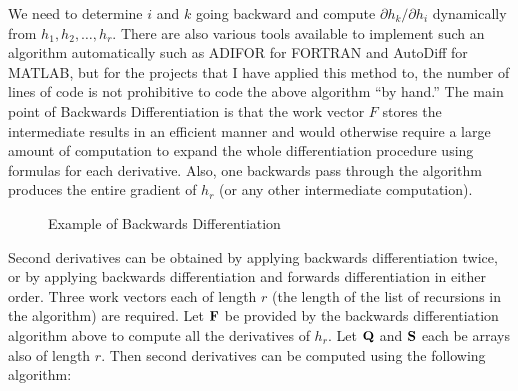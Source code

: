 We need to determine $i$ and $k$ going backward and compute $\partial h_k/\partial h_i$ dynamically from $h_1, h_2, \hdots, h_r$. There are also various tools available to 
implement such an algorithm automatically such as ADIFOR for FORTRAN and AutoDiff for MATLAB, but for the projects that I have applied this method to, the number of lines of code
is not prohibitive to code the above algorithm ``by hand.'' The main point of Backwards Differentiation is that the work vector $F$ stores the intermediate results in an efficient 
manner and would otherwise require a large amount of computation to expand the whole differentiation procedure using formulas for each derivative. Also, one backwards pass through the algorithm produces the entire gradient of $h_r$ (or any other intermediate computation). \\
\begin{figure}[hptp]
\begin{center}
   \caption{Example of Backwards Differentiation}
   \label{fig:BackwardsDifferentiation} 
\end{center}
\end{figure}

Second derivatives can be obtained by applying backwards differentiation twice, or by applying backwards differentiation and forwards differentiation in either order. Three work vectors each of length 
$r$ (the length of the list of recursions in the algorithm) are required. Let $\bf F$ be provided by the backwards differentiation algorithm above to compute all the derivatives of $h_r$. Let $\bf Q$ and $\bf S$ each be arrays also of length $r$. Then second derivatives can be computed using the following algorithm: 

